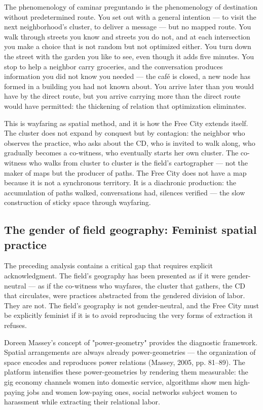The phenomenology of caminar preguntando is the phenomenology of destination without predetermined route. You set out with a general intention — to visit the next neighborhood's cluster, to deliver a message — but no mapped route. You walk through streets you know and streets you do not, and at each intersection you make a choice that is not random but not optimized either. You turn down the street with the garden you like to see, even though it adds five minutes. You stop to help a neighbor carry groceries, and the conversation produces information you did not know you needed — the café is closed, a new node has formed in a building you had not known about. You arrive later than you would have by the direct route, but you arrive carrying more than the direct route would have permitted: the thickening of relation that optimization eliminates.

This is wayfaring as spatial method, and it is how the Free City extends itself. The cluster does not expand by conquest but by contagion: the neighbor who observes the practice, who asks about the CD, who is invited to walk along, who gradually becomes a co-witness, who eventually starts her own cluster. The co-witness who walks from cluster to cluster is the field's cartographer — not the maker of maps but the producer of paths. The Free City does not have a map because it is not a synchronous territory. It is a diachronic production: the accumulation of paths walked, conversations had, silences verified — the slow construction of sticky space through wayfaring.

\subsection{The gender of field geography: Feminist spatial practice}

The preceding analysis contains a critical gap that requires explicit acknowledgment. The field's geography has been presented as if it were gender-neutral — as if the co-witness who wayfares, the cluster that gathers, the CD that circulates, were practices abstracted from the gendered division of labor. They are not. The field's geography is not gender-neutral, and the Free City must be explicitly feminist if it is to avoid reproducing the very forms of extraction it refuses.

Doreen Massey's concept of "power-geometry" provides the diagnostic framework. Spatial arrangements are always already power-geometries — the organization of space encodes and reproduces power relations (Massey, 2005, pp. 81–89). The platform intensifies these power-geometries by rendering them measurable: the gig economy channels women into domestic service, algorithms show men high-paying jobs and women low-paying ones, social networks subject women to harassment while extracting their relational labor.

